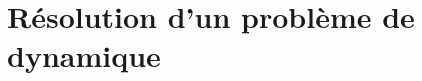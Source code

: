 %
%

\setchapterpreamble[u]{\margintoc}

\chapter{Résolution d'un problème de dynamique}

\setcounter{cptApplication}{1}
\setcounter{cptTD}{1}
\setcounter{cptColle}{1}





%
% 
%



\renewcommand{\repExo}{\repRel/PSI_Cy_04_ModelisationDynamique/Chapitre_03_Methodologie/PFD_1D/}
\renewcommand{\nomExo}{Cy_04_Ch_03_Application_01_Pompe}
\graphicspath{{\repStyle/png}{\repExo\nomExo/images}}

\proffalse
 
\iflivret \else \proftrue

\fi

\renewcommand{\repExo}{\repRel/PSI_Cy_04_ModelisationDynamique/Chapitre_03_Methodologie/PFD_CO/}
%
% 
%

\renewcommand{\nomExo}{Cy_04_03_PFD_CO_App_02_BancVib}
\graphicspath{{\repStyle/png}{\repExo\nomExo/images}}


